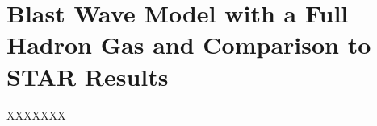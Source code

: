 
\section{Blast Wave Model with a Full Hadron Gas and Comparison to STAR Results}\label{sec:blast}

XXXXXXX

